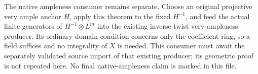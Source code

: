 The native ampleness consumer remains separate. Choose an original
projective very ample anchor $H$, apply this theorem
to the fixed $H^{-1}$, and feed the actual finite generators of
$H^{-1}\otimes L^m$ into the existing inverse-twist very-ampleness
producer. Its ordinary domain condition concerns only the coefficient
ring, so a field suffices and no integrality of $X$ is needed. This
consumer must await the separately validated source import of that
existing producer; its geometric proof is not repeated here. No final
native-ampleness claim is marked in this file.
